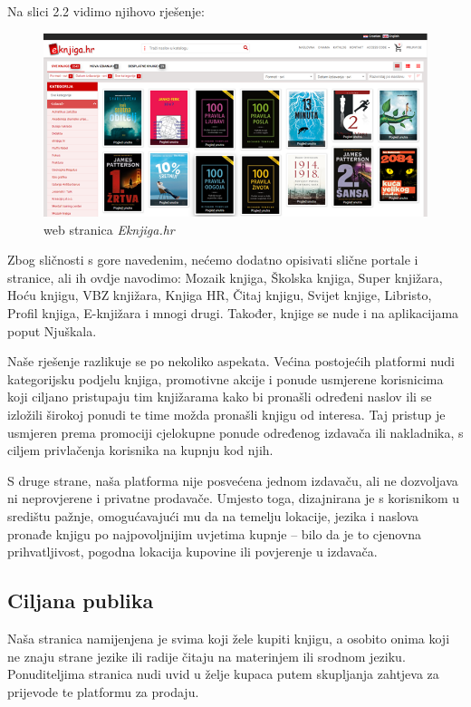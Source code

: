 		Na slici 2.2 vidimo njihovo rješenje:
		
		\begin{figure}[H]
			\includegraphics[scale=1]{slike/Eknjiga.PNG} %
			\centering
			\caption{web stranica \textit{Eknjiga.hr}}
			\label{fig:Eknjiga}
		\end{figure}
		
		
		Zbog sličnosti s gore navedenim, nećemo dodatno opisivati slične portale i stranice, ali ih ovdje navodimo: Mozaik knjiga, Školska knjiga, Super knjižara, Hoću knjigu, VBZ knjižara, Knjiga HR, Čitaj knjigu, Svijet knjige, Libristo, Profil knjiga, E-knjižara i mnogi drugi. Također, knjige se nude i na aplikacijama poput Njuškala.
		
		Naše rješenje razlikuje se po nekoliko aspekata. Većina postojećih platformi nudi kategorijsku podjelu knjiga, promotivne akcije i ponude usmjerene korisnicima koji ciljano pristupaju tim knjižarama kako bi pronašli određeni naslov ili se izložili širokoj ponudi te time možda pronašli knjigu od interesa. Taj pristup je usmjeren prema promociji cjelokupne ponude određenog izdavača ili nakladnika, s ciljem privlačenja korisnika na kupnju kod njih. 
		
		S druge strane, naša platforma nije posvećena jednom izdavaču, ali ne dozvoljava ni neprovjerene i privatne prodavače. Umjesto toga, dizajnirana je s korisnikom u središtu pažnje, omogućavajući mu da na temelju lokacije, jezika i naslova pronađe knjigu po najpovoljnijim uvjetima kupnje – bilo da je to cjenovna prihvatljivost, pogodna lokacija kupovine ili povjerenje u izdavača.
		
		\subsection{Ciljana publika}
		
		Naša stranica namijenjena je svima koji žele kupiti knjigu, a osobito onima koji ne znaju strane jezike ili radije čitaju na materinjem ili srodnom jeziku. Ponuditeljima stranica nudi uvid u želje kupaca putem skupljanja zahtjeva za prijevode te platformu za prodaju.
		
